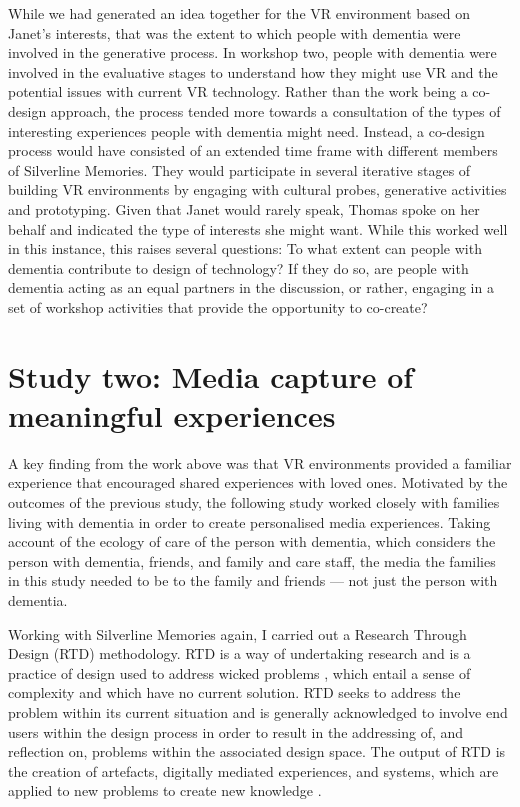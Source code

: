 While we had generated an idea together for the VR environment based on Janet's interests, that was the extent to which people with dementia were involved in the generative process. In workshop two, people with dementia were involved in the evaluative stages to understand how they might use VR and the potential issues with current VR technology. Rather than the work being  a co-design approach, the process tended more towards a consultation of the types of interesting experiences people with dementia might need. Instead, a co-design process would have consisted of an extended time frame with different members of Silverline Memories. They would participate in several iterative stages of building VR environments by engaging with cultural probes, generative activities and prototyping. Given that Janet would rarely speak, Thomas spoke on her behalf and indicated the type of interests she might want. While this worked well in this instance, this raises several questions: To what extent can people with dementia contribute to design of technology? If they do so, are people with dementia acting as an equal partners in the discussion, or rather, engaging in a set of workshop activities that provide the opportunity to co-create? \citep{tsekleves2020engaging,lindsay_empathy_2012}

\section{Study two: Media capture of meaningful experiences}
\label{studyTwo}
A key finding from the work above was that VR environments provided a familiar experience that encouraged shared experiences with loved ones. Motivated by the outcomes of the previous study, the following study worked closely with families living with dementia in order to create personalised media experiences.  Taking account of the ecology of care of the person with dementia, which considers the person with dementia, friends, and family and care staff, the media the families  in this study needed to be  to the family and friends — not just the person with dementia. 

Working with Silverline Memories again, I carried out a Research Through Design (RTD) methodology. RTD is a way of undertaking research and is a practice of design used to address wicked problems \citep{zimmerman_research_2007}, which entail a sense of complexity and which have no current solution. RTD seeks to address the problem within its current situation and is generally acknowledged to involve end users within the design process in order to result in the addressing of, and reflection on, problems within the associated design space. The output of RTD is the creation of artefacts, digitally mediated experiences, and systems, which are applied to new problems to create new knowledge \citep{gaver_what_2012,bardzell_documenting_2016}.

